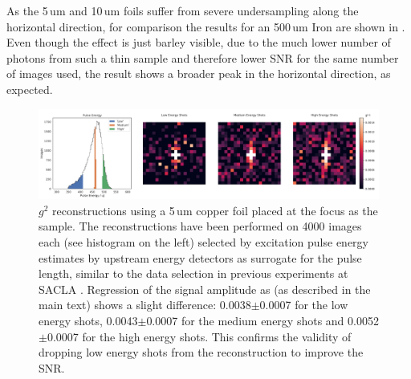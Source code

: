 As the 5\,um and 10\,um foils suffer from severe undersampling along the horizontal direction, for comparison the results for an 500\,um Iron are shown in . Even though the effect is just barley visible, due to the much lower number of photons from such a thin sample and therefore lower SNR for the same number of images used, the result shows a broader peak in the horizontal direction, as expected.


\begin{figure}
	\centering
	\includegraphics[width=\linewidth]{images/energy_binned.pdf}
	\caption[Excitation energy binned reconstruction]{$g^2$ reconstructions using a 5\,um copper foil placed at the focus as the sample. The reconstructions have been performed on 4000 images each (see histogram on the left)  selected by excitation pulse energy estimates by upstream energy detectors as surrogate for the pulse length, similar to the data selection in previous experiments at SACLA \cite{inoue2019}. Regression of the signal amplitude as (as described in the main text) shows a slight difference: 0.0038$\pm$0.0007 for the low energy shots, 0.0043$\pm$0.0007 for the medium energy shots and 0.0052$\pm$0.0007 for the high energy shots. This confirms the validity of dropping low energy shots from the reconstruction to improve the SNR.}
	\label{fig:energy_binned}
\end{figure}


